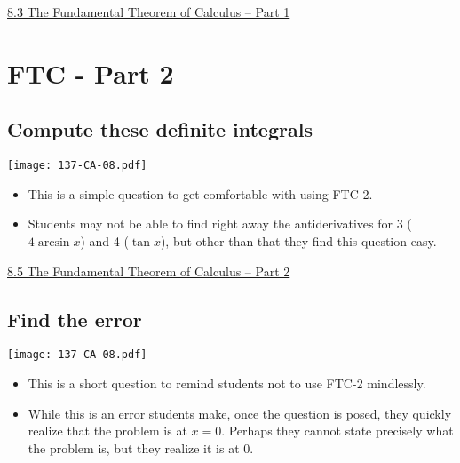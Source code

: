 \documentclass[11pt]{article}
\newcommand{\nl}{\hfill \vspace{-1.1\baselineskip}} %
\newcommand{\viii}{\hspace{8mm} \href{https://www.youtube.com/watch?v=JeKCipoy8bc&list=PLlwePzQY_wW_8-sITAbG_GU2JgiuwXkDN&index=3}{8.3 The Fundamental Theorem of Calculus -- Part 1}}
\newcommand{\vv}{\hspace{8mm} \href{https://www.youtube.com/watch?v=OKw2v0DOXOI&list=PLlwePzQY_wW_8-sITAbG_GU2JgiuwXkDN&index=5}{8.5 The Fundamental Theorem of Calculus -- Part 2}}
\begin{document}
\begin{videos}
\viii
\end{videos}

\newpage
\section{FTC - Part 2}
\subsection{Compute these definite integrals}

\begin{center}
{ \texttt{[image: 137-CA-08.pdf]}} 
\end{center}

\begin{comments}
\nl
	\begin{itemize}
		\item This is a simple question to get comfortable with using FTC-2.
		\item Students may not be able to find right away the antiderivatives for 3 ($4\arcsin x$) and 4 ($\tan x$), but other than that they find this question easy.
	\end{itemize}
\end{comments}

\begin{videos}
\vv
\end{videos}

\newpage
\subsection{Find the error}

\begin{center}
{ \texttt{[image: 137-CA-08.pdf]}} 
\end{center}

\begin{comments}
\nl
	\begin{itemize}
		\item This is a short question to remind students not to use FTC-2 mindlessly.
		\item While this is an error students make, once the question is posed, they quickly realize that the problem is at $x=0$.   Perhaps they cannot state precisely what the problem is, but they realize it is at $0$.
	\end{itemize}
\end{comments}
\end{document}
